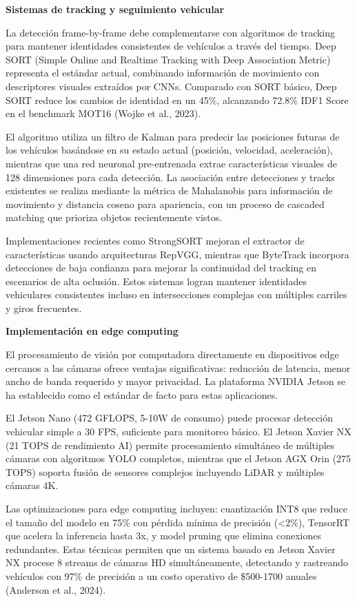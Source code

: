 \documentclass[12pt,a4paper,oneside]{report}
\begin{document}
\textbf{Sistemas de tracking y seguimiento vehicular}

La detección frame-by-frame debe complementarse con algoritmos de tracking para mantener identidades consistentes de vehículos a través del tiempo. Deep SORT (Simple Online and Realtime Tracking with Deep Association Metric) representa el estándar actual, combinando información de movimiento con descriptores visuales extraídos por CNNs. Comparado con SORT básico, Deep SORT reduce los cambios de identidad en un 45\%, alcanzando 72.8\% IDF1 Score en el benchmark MOT16 (Wojke et al., 2023).

El algoritmo utiliza un filtro de Kalman para predecir las posiciones futuras de los vehículos basándose en su estado actual (posición, velocidad, aceleración), mientras que una red neuronal pre-entrenada extrae características visuales de 128 dimensiones para cada detección. La asociación entre detecciones y tracks existentes se realiza mediante la métrica de Mahalanobis para información de movimiento y distancia coseno para apariencia, con un proceso de cascaded matching que prioriza objetos recientemente vistos.

Implementaciones recientes como StrongSORT mejoran el extractor de características usando arquitecturas RepVGG, mientras que ByteTrack incorpora detecciones de baja confianza para mejorar la continuidad del tracking en escenarios de alta oclusión. Estos sistemas logran mantener identidades vehiculares consistentes incluso en intersecciones complejas con múltiples carriles y giros frecuentes.

\textbf{Implementación en edge computing}

El procesamiento de visión por computadora directamente en dispositivos edge cercanos a las cámaras ofrece ventajas significativas: reducción de latencia, menor ancho de banda requerido y mayor privacidad. La plataforma NVIDIA Jetson se ha establecido como el estándar de facto para estas aplicaciones.

El Jetson Nano (472 GFLOPS, 5-10W de consumo) puede procesar detección vehicular simple a 30 FPS, suficiente para monitoreo básico. El Jetson Xavier NX (21 TOPS de rendimiento AI) permite procesamiento simultáneo de múltiples cámaras con algoritmos YOLO completos, mientras que el Jetson AGX Orin (275 TOPS) soporta fusión de sensores complejos incluyendo LiDAR y múltiples cámaras 4K.

Las optimizaciones para edge computing incluyen: cuantización INT8 que reduce el tamaño del modelo en 75\% con pérdida mínima de precisión (\textless2\%), TensorRT que acelera la inferencia hasta 3x, y model pruning que elimina conexiones redundantes. Estas técnicas permiten que un sistema basado en Jetson Xavier NX procese 8 streams de cámaras HD simultáneamente, detectando y rastreando vehículos con 97\% de precisión a un costo operativo de \$500-1700 anuales (Anderson et al., 2024).
\end{document}
